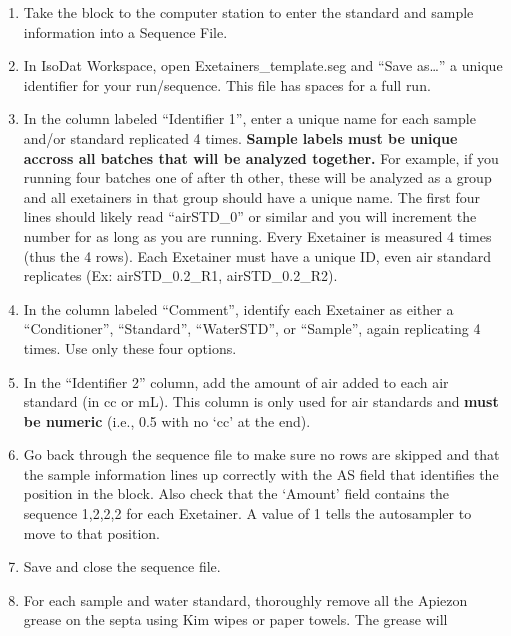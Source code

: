 \documentclass[]{article}
\providecommand{\tightlist}{%
  \setlength{\itemsep}{0pt}\setlength{\parskip}{0pt}}
\begin{document}
\begin{enumerate}
\def\labelenumi{\arabic{enumi}.}
\setcounter{enumi}{1}
\tightlist
\item
  Take the block to the computer station to enter the standard and
  sample information into a Sequence File.\\
\item
  In IsoDat Workspace, open Exetainers\_template.seg and ``Save
  as\ldots{}'' a unique identifier for your run/sequence. This file has
  spaces for a full run.\\
\item
  In the column labeled ``Identifier 1'', enter a unique name for each
  sample and/or standard replicated 4 times. \textbf{Sample labels must
  be unique accross all batches that will be analyzed together.} For
  example, if you running four batches one of after th other, these will
  be analyzed as a group and all exetainers in that group should have a
  unique name. The first four lines should likely read ``airSTD\_0'' or
  similar and you will increment the number for as long as you are
  running. Every Exetainer is measured 4 times (thus the 4 rows). Each
  Exetainer must have a unique ID, even air standard replicates (Ex:
  airSTD\_0.2\_R1, airSTD\_0.2\_R2).\\
\item
  In the column labeled ``Comment'', identify each Exetainer as either a
  ``Conditioner'', ``Standard'', ``WaterSTD'', or ``Sample'', again
  replicating 4 times. Use only these four options.\\
\item
  In the ``Identifier 2'' column, add the amount of air added to each
  air standard (in cc or mL). This column is only used for air standards
  and \textbf{must be numeric} (i.e., 0.5 with no `cc' at the end).\\
\item
  Go back through the sequence file to make sure no rows are skipped and
  that the sample information lines up correctly with the AS field that
  identifies the position in the block. Also check that the `Amount'
  field contains the sequence 1,2,2,2 for each Exetainer. A value of 1
  tells the autosampler to move to that position.\\
\item
  Save and close the sequence file.\\
\item
  For each sample and water standard, thoroughly remove all the Apiezon
  grease on the septa using Kim wipes or paper towels. The grease will

\end{enumerate}
\end{document}
